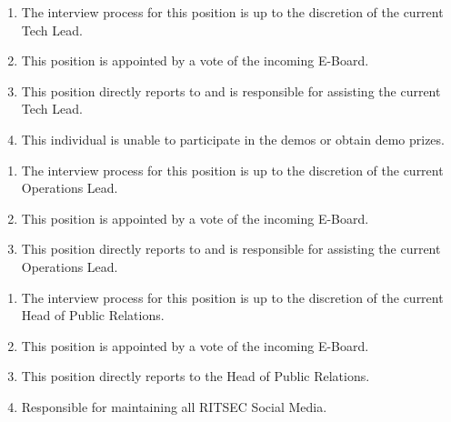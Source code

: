 
\begin{enumerate}
      \item The interview process for this position is up to the discretion of the current
            Tech Lead.
      \item This position is appointed by a vote of the incoming E-Board.
      \item This position directly reports to and is responsible for assisting the current
            Tech Lead.
      \item This individual is unable to participate in the demos or obtain demo prizes.
\end{enumerate}


\begin{enumerate}
      \item The interview process for this position is up to the discretion of the current
            Operations Lead.
      \item This position is appointed by a vote of the incoming E-Board.
      \item This position directly reports to and is responsible for assisting the current
            Operations Lead.
\end{enumerate}


\begin{enumerate}
      \item The interview process for this position is up to the discretion of the current
            Head of Public Relations.
      \item This position is appointed by a vote of the incoming E-Board.
      \item This position directly reports to the Head of Public Relations.
      \item Responsible for maintaining all RITSEC Social Media.
\end{enumerate}
